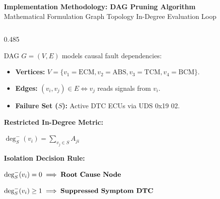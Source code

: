 \documentclass[aspectratio=169,10pt]{beamer}
\newcommand{\slidetitle}[2]{%
  \vspace{0.08cm}
  {\Large\bfseries\color{vectorred}#1}\\[2pt]
  {\footnotesize\color{slategrey}#2}
  \vspace{0.10cm}
}
\begin{document}
\begin{frame}[t]
\slidetitle{Implementation Methodology: DAG Pruning Algorithm}{Mathematical Formulation \textbullet{} Graph Topology \textbullet{} In-Degree Evaluation Loop}

\begin{columns}[T,totalwidth=\textwidth]

  \begin{column}{0.485\textwidth}
    \begin{tcolorbox}[cardstyle, colframe=vectorred!70, colbacktitle=vectorred!8, height=5.95cm,
      title={\normalsize\bfseries\color{vectorred} 1. Graph Formulation \& In-Degree}]
      \footnotesize\color{slatedark}\raggedright
      DAG $G = (V, E)$ models causal fault dependencies:
      \vspace{-3pt}
      \begin{itemize}\setlength{\itemsep}{1pt}\setlength{\leftmargini}{10pt}
        \item \textbf{Vertices:} $V=\{v_1{=}\text{ECM}, v_2{=}\text{ABS}, v_3{=}\text{TCM}, v_4{=}\text{BCM}\}$.
        \item \textbf{Edges:} $(v_i, v_j) \in E \iff v_j$ reads signals from $v_i$.
        \item \textbf{Failure Set ($S$):} Active DTC ECUs via UDS 0x19 02.
      \end{itemize}
      \vspace{-3pt}
      \textbf{Restricted In-Degree Metric:}\par
      \vspace{1pt}
      {\centering$\displaystyle \deg_S^-(v_i) = \sum_{v_j \in S} A_{ji}$\par}
      \vspace{3pt}
      \textbf{Isolation Decision Rule:}\par
      \vspace{1pt}
      {\centering$\deg_S^-(v_i) = 0 \implies \text{\textbf{Root Cause Node}}$\par}
      \vspace{1pt}
      {\centering$\deg_S^-(v_i) \ge 1 \implies \text{\textbf{Suppressed Symptom DTC}}$\par}
    \end{tcolorbox}
  \end{column}


\end{columns}
\end{frame}
\end{document}
